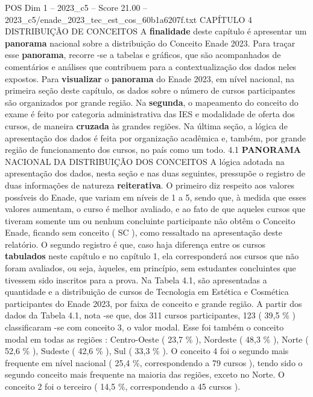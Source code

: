 \begin{textsample}{POS Dim 1 – 2023\_c5 – Score 21.00 – 2023\_c5/enade\_2023\_tec\_est\_cos\_60b1a6207f.txt}  \label{ex:f1_pos_020}
CAPÍTULO 4 DISTRIBUIÇÃO DE CONCEITOS A \textbf{finalidade} deste capítulo é apresentar um \textbf{panorama} nacional sobre a distribuição do Conceito Enade 2023.
Para traçar esse \textbf{panorama}, recorre -se a tabelas e gráficos, que são acompanhados de comentários e análises que contribuem para a contextualização dos dados neles expostos.
Para \textbf{visualizar} o \textbf{panorama} do Enade 2023, em nível nacional, na primeira seção deste capítulo, os dados sobre o número de cursos participantes são organizados por grande região.
Na \textbf{segunda}, o mapeamento do conceito do exame é feito por categoria administrativa das IES e modalidade de oferta dos cursos, de maneira \textbf{cruzada} às grandes regiões.
Na última seção, a lógica de apresentação dos dados é feita por organização acadêmica e, também, por grande região de funcionamento dos cursos, no país como um todo. 4.1 \textbf{PANORAMA} NACIONAL DA DISTRIBUIÇÃO DOS CONCEITOS A lógica adotada na apresentação dos dados, nesta seção e nas duas seguintes, pressupõe o registro de duas informações de natureza \textbf{reiterativa}.
O primeiro diz respeito aos valores possíveis do Enade, que variam em níveis de 1 a 5, sendo que, à medida que esses valores aumentam, o curso é melhor avaliado, e ao fato de que aqueles cursos que tiveram somente um ou nenhum concluinte participante não obtêm o Conceito Enade, ficando sem conceito ( SC ), como ressaltado na apresentação deste relatório.
O segundo registro é que, caso haja diferença entre os cursos \textbf{tabulados} neste capítulo e no capítulo 1, ela corresponderá aos cursos que não foram avaliados, ou seja, àqueles, em princípio, sem estudantes concluintes que tivessem sido inscritos para a prova.
Na Tabela 4.1, são apresentadas a quantidade e a distribuição de cursos de Tecnologia em Estética e Cosmética participantes do Enade 2023, por faixa de conceito e grande região.
A partir dos dados da Tabela 4.1, nota -se que, dos 311 cursos participantes, 123 ( 39,5 \% ) classificaram -se com conceito 3, o valor modal.
Esse foi também o conceito modal em todas as regiões : Centro-Oeste ( 23,7 \% ), Nordeste ( 48,3 \% ), Norte ( 52,6 \% ), Sudeste ( 42,6 \% ), Sul ( 33,3 \% ).
O conceito 4 foi o segundo mais frequente em nível nacional ( 25,4 \%, correspondendo a 79 cursos ), tendo sido o segundo conceito mais frequente na maioria das regiões, exceto no Norte.
O conceito 2 foi o terceiro ( 14,5 \%, correspondendo a 45 cursos ).

\end{textsample}
